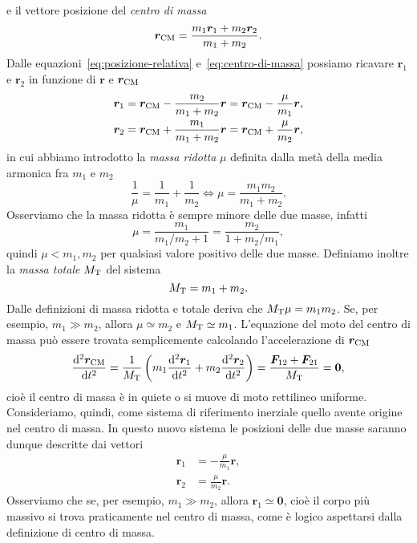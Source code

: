 e il vettore posizione del \emph{centro di massa}
\begin{equation}
  \label{eq:centro-di-massa}
  \bm{r}_\textup{CM} = \frac{m_1\bm{r}_1+m_2\bm{r}_2}{m_1+m_2}.
\end{equation}
Dalle equazioni~\eqref{eq:posizione-relativa} e~\eqref{eq:centro-di-massa}
possiamo ricavare $\bm{r}_1$ e $\bm{r}_2$ in funzione di $\bm{r}$ e
$\bm{r}_\textup{CM}$
\begin{subequations}
  \label{eq:r1-r2-posizione-relativa-cdm}
  \begin{align}
    \bm{r}_1 &= \bm{r}_\textup{CM} - \frac{m_2}{m_1+m_2}\bm{r} =
    \bm{r}_\textup{CM} - \frac{\mu}{m_1}\bm{r},\\
    \bm{r}_2 &= \bm{r}_\textup{CM} + \frac{m_1}{m_1+m_2}\bm{r} =
    \bm{r}_\textup{CM} + \frac{\mu}{m_2}\bm{r},
  \end{align}
\end{subequations}
in cui abbiamo introdotto la \emph{massa ridotta} $\mu$ definita dalla metà
della media armonica fra $m_1$ e $m_2$
\begin{equation}
  \frac{1}{\mu} = \frac{1}{m_1} + \frac{1}{m_2} \iff \mu=\frac{m_1m_2}{m_1+m_2}.
\end{equation}
Osserviamo che la massa ridotta è sempre minore delle due masse, infatti
\begin{equation}
  \mu =\frac{m_1}{m_1/m_2+1} = \frac{m_2}{1+m_2/m_1},
\end{equation}
quindi $\mu < m_1,m_2$ per qualsiasi valore positivo delle due masse. Definiamo
inoltre la \emph{massa totale} $M_\textup{T}$ del sistema
\begin{equation}
  M_\textup{T}=m_1+m_2.
\end{equation}
Dalle definizioni di massa ridotta e totale deriva che
$M_\textup{T}\mu=m_1m_2$. Se, per esempio, $m_1\gg m_2$, allora $\mu\simeq m_2$ e
$M_\textup{T}\simeq m_1$. L'equazione del moto del centro di massa può essere
trovata semplicemente calcolando l'accelerazione di $\bm{r}_\textup{CM}$
\begin{equation}
  \toder[2]{\bm{r}_\textup{CM}}{t} = \frac{1}{M_\textup{T}}
  \left(
    m_1\toder[2]{\bm{r}_1}{t} + m_2\toder[2]{\bm{r}_2}{t}
  \right) = \frac{\bm{F}_{12}+\bm{F}_{21}}{M_\textup{T}} = \bm{0},
\end{equation}
cioè il centro di massa è in quiete o si muove di moto rettilineo
uniforme. Consideriamo, quindi, come sistema di riferimento inerziale quello
avente origine nel centro di massa. In questo nuovo sistema le posizioni delle
due masse saranno dunque descritte dai vettori
\begin{subequations}
  \label{eq:r1-r2-nel-cdm}
  \begin{align}
    \bm{r}_1 &= -\frac{\mu}{m_1}\bm{r}, \label{eq:r1-nel-cdm}\\
    \bm{r}_2 &= \frac{\mu}{m_2}\bm{r}.
  \end{align}
\end{subequations}
Osserviamo che se, per esempio, $m_1\gg m_2$, allora $\bm{r}_1\simeq\bm{0}$,
cioè il corpo più massivo si trova praticamente nel centro di massa, come è
logico aspettarsi dalla definizione di centro di massa.

